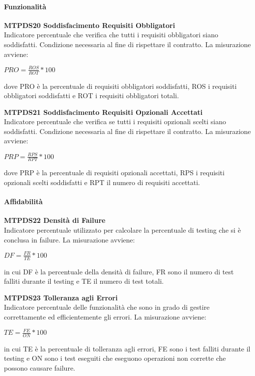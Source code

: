 \paragraph{Funzionalità}
\begin{itemize}

	\item \textbf{MTPDS20 Soddisfacimento Requisiti Obbligatori}\-\\
Indicatore percentuale che verifica che tutti i requisiti obbligatori siano soddisfatti. Condizione necessaria al fine di rispettare il contratto. La misurazione avviene:
\begin{center}
	\item $PRO = \frac{ROS}{ROT}*100$
\end{center}
dove PRO è la percentuale di requisiti obbligatori soddisfatti, ROS i requisiti obbligatori soddisfatti e ROT i requisiti obbligatori totali.

	\item \textbf{MTPDS21 Soddisfacimento Requisiti Opzionali Accettati}\-\\
Indicatore percentuale che verifica se tutti i requisiti opzionali scelti siano soddisfatti. Condizione necessaria al fine di rispettare il contratto. La misurazione avviene:
\begin{center}
	\item $PRP = \frac{RPS}{RPT}*100$
\end{center}
dove PRP è la percentuale di requisiti opzionali accettati, RPS i requisiti opzionali scelti soddisfatti e RPT il numero di requisiti accettati.
\end{itemize}

\paragraph{Affidabilità}

\begin{itemize}
	\item \textbf{MTPDS22 Densità di Failure} \-\\
	Indicatore percentuale utilizzato per calcolare la percentuale di testing che si è conclusa in failure. La misurazione avviene: 
	\begin{center}
		\item $ DF = \frac{FR}{TE}*100 $
	\end{center}
	in cui DF è la percentuale della densità di failure, FR sono il numero di test falliti durante il testing e TE il numero di test totali. 
	\item \textbf{MTPDS23 Tolleranza agli Errori} \-\\
	Indicatore percentuale delle funzionalità che sono in grado di gestire correttamente ed efficientemente gli errori. La misurazione avviene: 
	\begin{center}
		\item $ TE = \frac{FE}{ON}*100 $
	\end{center}
	in cui TE è la percentuale di tolleranza agli errori, FE sono i test falliti durante il testing e ON sono i test eseguiti che eseguono operazioni non corrette che possono causare failure. 
\end{itemize}

